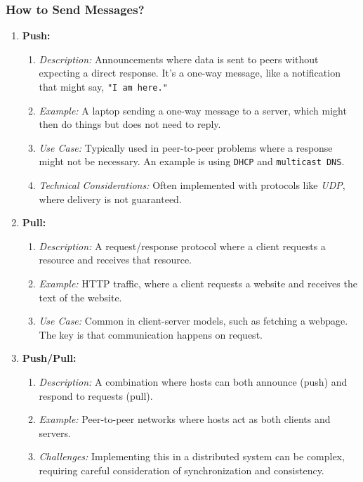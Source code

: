 \subsubsection{How to Send Messages?}
\begin{enumerate}
    \item \textbf{Push:}
    \begin{enumerate}[itemsep=0.5pt,topsep=0pt]
        \item \textit{Description:} Announcements where data is sent to peers without expecting a direct response. It's a one-way message, like a notification that might say, \texttt{"I am here."}
        \item \textit{Example:} A laptop sending a one-way message to a server, which might then do things but does not need to reply.
        \item \textit{Use Case:} Typically used in peer-to-peer problems where a response might not be necessary. An example is using \texttt{DHCP} and \texttt{multicast DNS}.
        \item \textit{Technical Considerations:} Often implemented with protocols like \textit{UDP}, where delivery is not guaranteed.
    \end{enumerate}

    \item \textbf{Pull:}
    \begin{enumerate}[itemsep=0.5pt,topsep=0pt]
        \item \textit{Description:} A request/response protocol where a client requests a resource and receives that resource.
        \item \textit{Example:} HTTP traffic, where a client requests a website and receives the text of the website.
        \item \textit{Use Case:} Common in client-server models, such as fetching a webpage. The key is that communication happens on request.
    \end{enumerate}

    \item \textbf{Push/Pull:}
    \begin{enumerate}[itemsep=0.5pt,topsep=0pt]
        \item \textit{Description:} A combination where hosts can both announce (push) and respond to requests (pull).
        \item \textit{Example:} Peer-to-peer networks where hosts act as both clients and servers.
        \item \textit{Challenges:} Implementing this in a distributed system can be complex, requiring careful consideration of synchronization and consistency.
    \end{enumerate}
\end{enumerate}


